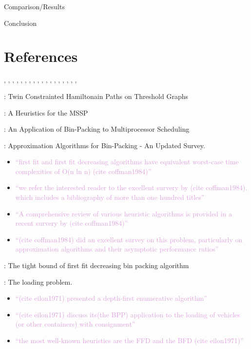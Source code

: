 \documentclass{llncs}
\begin{document}
Comparison/Results

Conclusion
\section{References}
\cite{becker2010}, \cite{becker2015}, \cite{coffman1978}, \cite{dosa2007}, \cite{eilon1971}, \cite{garey1979}, \cite{gilmore1961}, \cite{gilmore1963}, \cite{goulimis2004}, \cite{johnson1974}, \cite{karp1972}, \cite{korf2002}, \cite{lewis2009}, \cite{lewis2017}, \cite{lewis2011}, \cite{mahadev1994}, \cite{mahadev1995}, \cite{martello1990a}, \cite{martello1990b}

\cite{becker2010}: Twin Constrainted Hamiltonain Paths on Threshold Graphs 

\cite{becker2015}: A Heuristics for the MSSP

\cite{coffman1978}: An Application of Bin-Packing to Multiprocessor Scheduling

\cite{coffman1984}: Approximation Algorithms for Bin-Packing - An Updated Survey.
\begin{itemize}
	\item \textcolor{Plum}{``first fit and first fit decreasing algorithms have equivalent worst-case time complexities of O(n ln n) (cite coffman1984)''}
	\item \textcolor{Plum}{``we refer the interested reader to the excellent survery by (cite coffman1984), which includes a bibliography of more than one hundred titles''}
	\item \textcolor{Plum}{``A comprehensive review of various heuristic algorithms is provided in a recent survery by (cite coffman1984)''}
	\item \textcolor{Plum}{``(cite coffman1984) did an excellent survey on this problem, particularly on approximation algorithms and their asymptotic performance ratios''}
\end{itemize}

\cite{dosa2007}: The tight bound of first fit decreasing bin packing algorithm

\cite{eilon1971}: The loading problem. 
\begin{itemize}
	\item \textcolor{Plum}{``(cite eilon1971) presented a depth-first enumerative algorithm''}
	\item \textcolor{Plum}{``(cite eilon1971) discuss its(the BPP) application to the loading of vehicles (or other containers) with consignment''}
	\item \textcolor{Plum}{``the most well-known heuristics are the FFD and the BFD (cite eilon1971)''}
\end{itemize}
\end{document}
